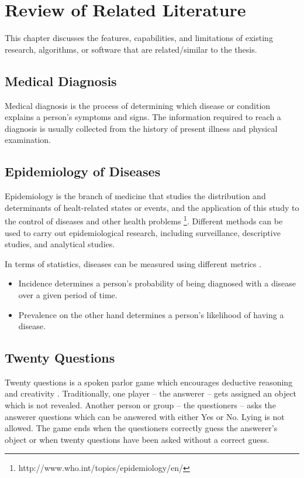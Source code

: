 %
%
%                 

\chapter{Review of Related Literature}
\label{sec:relatedlit}

This chapter discusses the features, capabilities, and limitations of existing research, algorithms, or software 
that are related/similar to the thesis.

\section{Medical Diagnosis}
Medical diagnosis is the process of determining which disease or condition explains a person's symptoms and signs. 
The information required to reach a diagnosis is usually collected from the history of present illness and physical examination.

\section{Epidemiology of Diseases}
Epidemiology is the branch of medicine that studies the distribution and determinants of healt-related states or events, and the application of this study to the control of diseases and other health problems \footnote{http://www.who.int/topics/epidemiology/en/}.
Different methods can be used to carry out epidemiological research, including surveillance, descriptive studies, and analytical studies.

In terms of statistics, diseases can be measured using different metrics \cite{nydoh:1999}. 
\begin{itemize}
\item Incidence determines a person's probability of being diagnosed with a disease over a given period of time.
\item Prevalence on the other hand determines a person's likelihood of having a disease.
\end{itemize}




\section{Twenty Questions}
Twenty questions is a spoken parlor game which encourages deductive reasoning and creativity \cite{wiki:twenty_questions}.
Traditionally, one player -- the answerer -- gets assigned an object which is not revealed.
Another person or group -- the questioners -- asks the answerer questions which can be answered with either Yes or No. 
Lying is not allowed.
The game ends when the questioners correctly guess the answerer's object or when twenty questions have been asked without a correct guess.

